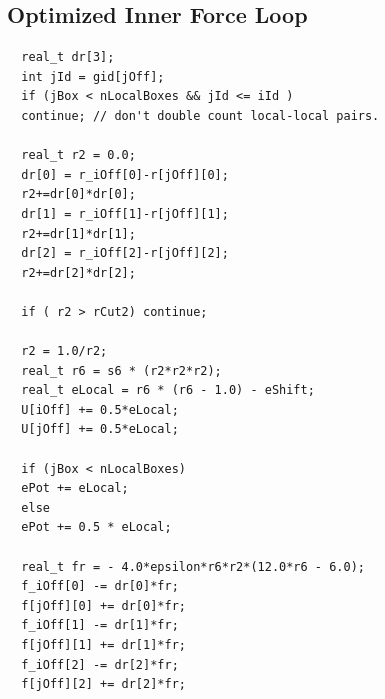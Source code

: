 \documentclass[12pt]{article}
\begin{document}
\subsection{Optimized Inner Force Loop}
\begin{lstlisting}
  real_t dr[3];
  int jId = gid[jOff];  
  if (jBox < nLocalBoxes && jId <= iId )
  continue; // don't double count local-local pairs.

  real_t r2 = 0.0;
  dr[0] = r_iOff[0]-r[jOff][0];
  r2+=dr[0]*dr[0];
  dr[1] = r_iOff[1]-r[jOff][1];
  r2+=dr[1]*dr[1];
  dr[2] = r_iOff[2]-r[jOff][2];
  r2+=dr[2]*dr[2];

  if ( r2 > rCut2) continue;

  r2 = 1.0/r2;
  real_t r6 = s6 * (r2*r2*r2);
  real_t eLocal = r6 * (r6 - 1.0) - eShift;
  U[iOff] += 0.5*eLocal;
  U[jOff] += 0.5*eLocal;

  if (jBox < nLocalBoxes)
  ePot += eLocal;
  else
  ePot += 0.5 * eLocal;

  real_t fr = - 4.0*epsilon*r6*r2*(12.0*r6 - 6.0);
  f_iOff[0] -= dr[0]*fr;
  f[jOff][0] += dr[0]*fr;
  f_iOff[1] -= dr[1]*fr;
  f[jOff][1] += dr[1]*fr;
  f_iOff[2] -= dr[2]*fr;
  f[jOff][2] += dr[2]*fr;
\end{lstlisting}
\end{document}
